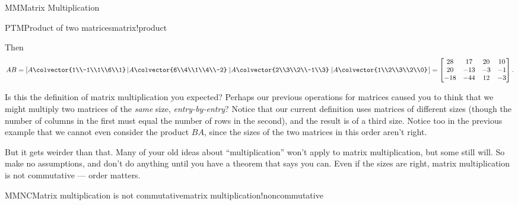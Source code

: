 \begin{subsect}{MM}{Matrix Multiplication}
\begin{example}{PTM}{Product of two matrices}{matrix!product}
\begin{para}
\end{para}
%
\begin{para}Then
%
\begin{equation*}
AB=
\left[
A\colvector{1\\-1\\1\\6\\1}
\left\lvert A\colvector{6\\4\\1\\4\\-2}\right.
\left\lvert A\colvector{2\\3\\2\\-1\\3}\right.
\left\lvert A\colvector{1\\2\\3\\2\\0}\right.
\right]
=
\begin{bmatrix}
28 & 17 & 20 & 10\\
20 & -13 & -3 & -1\\
-18 & -44 & 12 & -3
\end{bmatrix}.
\end{equation*}
\end{para}
%
\end{example}
%
\begin{para}Is this the definition of matrix multiplication you expected?  Perhaps our previous operations for matrices caused you to think that we might multiply two matrices of the {\em same} size, {\em entry-by-entry}?  Notice that our current definition uses matrices of different sizes (though the number of columns in the first must equal the number of rows in the second), and the result is of a third size.  Notice too in the previous example that we cannot even consider the product $BA$, since the sizes of the two matrices in this order aren't right.\end{para}
%
\begin{para}But it gets weirder than that.  Many of your old ideas about ``multiplication'' won't apply to matrix multiplication, but some still will.  So make no assumptions, and don't do anything until you have a theorem that says you can.  Even if the sizes are right, matrix multiplication is not commutative --- order matters.\end{para}
%
\begin{example}{MMNC}{Matrix multiplication is not commutative}{matrix multiplication!noncommutative}

\end{example}
\end{subsect}
